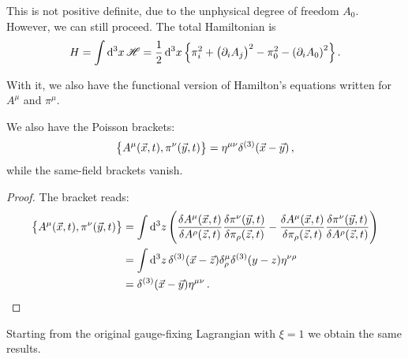 \documentclass[main.tex]{subfiles}
\begin{document}
This is not positive definite, due to the unphysical degree of freedom \(A_0 \).
However, we can still proceed. The total Hamiltonian is 
%
\begin{align}
H = \int \dd[3]{x} \mathscr{H} = \frac{1}{2} \dd[3]{x}
\qty{ \pi_{i}^2  + \qty(\partial_{i} A_{j})^2 - \pi_0^2 - \qty(\partial_{i} A_{0})^2}
\,.
\end{align}

With it, we also have the functional version of Hamilton's equations written for \(A^{\mu }\) and \(\pi^{\mu }\). 

\begin{claim}
We also have the Poisson brackets: 
%
\begin{align}
    \qty{A^{\mu } (\vec{x}, t), \pi^{\nu }(\vec{y}, t)} = \eta^{\mu \nu }
    \delta^{(3)} (\vec{x} - \vec{y})
    \,,
\end{align}
%
while the same-field brackets vanish.
\end{claim} 

\begin{proof}
The bracket reads: 
%
\begin{align}
\qty{A^{\mu } (\vec{x}, t), \pi^{\nu }(\vec{y}, t)}
&= \int \dd[3]{z} \qty(
\fdv{A^{\mu }(\vec{x}, t)}{A^{\rho }(\vec{z}, t)}
\fdv{\pi ^{\nu }(\vec{y}, t)}{\pi _{\rho }(\vec{z}, t)}
-
\fdv{A^{\mu }(\vec{x}, t)}{\pi _{\rho }(\vec{z}, t)}
\fdv{\pi ^{\nu }(\vec{y}, t)}{A^{\rho }(\vec{z}, t)}
)  \\
&= \int \dd[3]{z} \delta^{(3)} (\vec{x} - \vec{z}) \delta^{\mu }_{\rho }
\delta^{(3)}(y-z) \eta^{\nu \rho }  \\
&= \delta^{(3)} (\vec{x} - \vec{y}) \eta^{\mu \nu }
\,.
\end{align}
\end{proof}

\begin{claim}
Starting from the original gauge-fixing Lagrangian with \(\xi = 1\) we obtain the same results. 
\end{claim}

\end{document}
